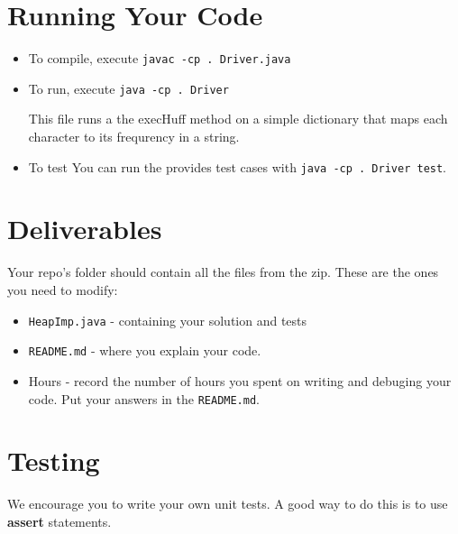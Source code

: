 \documentclass[12pt]{article}
\begin{document}
\section{Running Your Code}
\begin{itemize}
\item To compile, execute \texttt{javac -cp . Driver.java}
\item To run, execute \texttt{java -cp . Driver}

This file runs a the execHuff method on a simple dictionary that maps each character to its frequrency in a string.
\item To test
You can run the provides test cases with \texttt{java -cp . Driver test}.
\end{itemize}

\section{Deliverables}

Your repo's folder should contain all the files from the zip.  These
are the ones you need to modify:
\begin{itemize}
\item \texttt{HeapImp.java} - containing your solution and tests
\item \texttt{README.md} - where you explain your code.
\item Hours - record the number of hours you spent on writing and
  debuging your code. Put your answers in the \texttt{README.md}.
\end{itemize}

\section{Testing}

 We encourage you to write
your own unit tests. A good way to do this is to use \textbf{assert}
statements.
\end{document}
